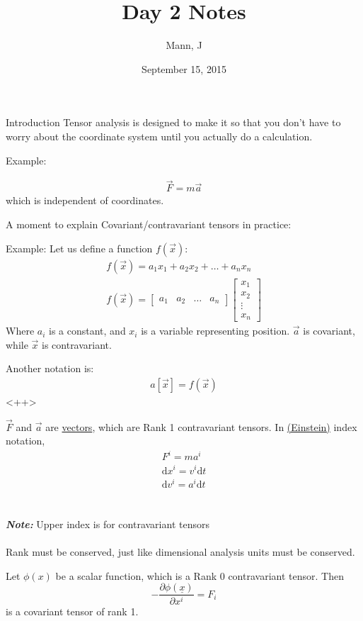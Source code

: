 \documentclass{article}
\author{Mann, J}
\title{Day 2 Notes}
\date{September 15, 2015}
\renewcommand{\d}[0]{\mathrm{d}}
\newcommand{\note}[1]{\\\\\textit{\textbf{Note: }}#1\\\\}
\newcommand{\pOne}[2]{\frac{\partial #1}{\partial #2}}
\begin{document}
\maketitle{}
\begin{section}{Introduction}
  Tensor analysis is designed to make it so that you don't have to worry about the coordinate system until you actually do a calculation.

	Example: 

	\begin{align*}
		\vec{F} = m\vec{a}
	\end{align*}
	which is independent of coordinates.

	A moment to explain Covariant/contravariant tensors in practice:

	Example: Let us define a function $f(\vec{x})$:
\begin{align*}
	f(\vec{x}) = a_1 x_1 + a_2 x_2 + \dots + a_n x_n\\
	f(\vec{x}) = \begin{bmatrix}a_1 & a_2 & \dots & a_n\end{bmatrix} \begin{bmatrix}x_1 \\ x_2 \\ \vdots \\ x_n\end{bmatrix}
\end{align*}
Where $a_i$ is a constant, and $x_i$ is a variable representing position.  $\vec{a}$ is covariant, while $\vec{x}$ is contravariant.

Another notation is:
\begin{align*}
	a[\vec{x}] = f(\vec{x})
\end{align*}<++>

	$\vec{F}$ and $\vec{a}$ are \underline{vectors}, which are Rank 1 contravariant tensors. In \href{https://en.wikipedia.org/wiki/Einstein_notation#Vector_representations}{(Einstein)} index notation, 
  \begin{align*}
    F^i = m a^i\\
    \d x^i = v^i \d t\\
    \d v^i = a^i \d t
  \end{align*}
	\note{Upper index is for contravariant tensors}

  Rank must be conserved, just like dimensional analysis units must be conserved.
  
	Let $\phi(x)$ be a scalar function, which is a Rank 0 contravariant tensor. Then
	$$-\pOne{\phi(\underline{x})}{x^i} = F_i$$ is a covariant tensor of rank 1.


\end{section}
\end{document}
